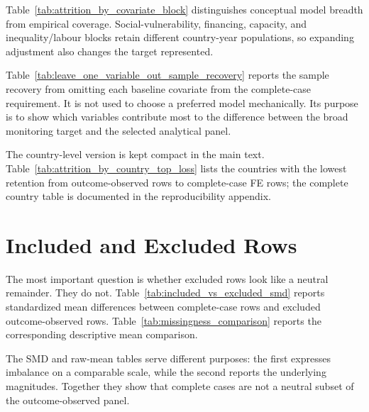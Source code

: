 

Table~\ref{tab:attrition_by_covariate_block} distinguishes conceptual model breadth from empirical coverage. Social-vulnerability, financing, capacity, and inequality/labour blocks retain different country-year populations, so expanding adjustment also changes the target represented.

Table~\ref{tab:leave_one_variable_out_sample_recovery} reports the sample recovery from omitting each baseline covariate from the complete-case requirement. It is not used to choose a preferred model mechanically. Its purpose is to show which variables contribute most to the difference between the broad monitoring target and the selected analytical panel.



The country-level version is kept compact in the main text. Table~\ref{tab:attrition_by_country_top_loss} lists the countries with the lowest retention from outcome-observed rows to complete-case FE rows; the complete country table is documented in the reproducibility appendix.



\section{Included and Excluded Rows}

The most important question is whether excluded rows look like a neutral remainder. They do not. Table~\ref{tab:included_vs_excluded_smd} reports standardized mean differences between complete-case rows and excluded outcome-observed rows. Table~\ref{tab:missingness_comparison} reports the corresponding descriptive mean comparison.



\begin{table}[htbp]
\centering
\caption{Raw mean comparison between complete-case and excluded outcome-observed rows. Welch tests are descriptive selection diagnostics.}
\label{tab:missingness_comparison}

\end{table}

The SMD and raw-mean tables serve different purposes: the first expresses imbalance on a comparable scale, while the second reports the underlying magnitudes. Together they show that complete cases are not a neutral subset of the outcome-observed panel.

